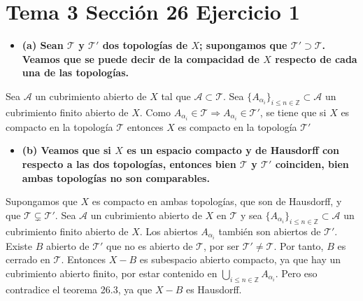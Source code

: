 \documentclass{article}
\begin{document}
\section{Tema 3 Sección 26 Ejercicio 1}
\begin{itemize}
\item \bf (a) \rm Sean $\mathcal{T}$ y $\mathcal{T}'$ dos topologías de $X$; supongamos que $\mathcal{T}'\supset \mathcal{T}$. Veamos que se puede decir de la compacidad de $X$ respecto de cada una de las topologías. 
\end{itemize}
Sea $\mathcal{A}$ un cubrimiento abierto de $X$ tal que $\mathcal{A}\subset\mathcal{T}$. Sea $\{A_{\alpha_i}\}_{i\leq n\in \mathbb{Z}}\subset \mathcal{A}$ un cubrimiento finito abierto de $X$. Como $A_{\alpha_i}\in \mathcal{T}\Rightarrow A_{\alpha_i}\in \mathcal{T}'$, se tiene que si $X$ es compacto en la topología $\mathcal{T}$ entonces $X$ es compacto en la topología $\mathcal{T}'$
\begin{itemize}
\item \bf (b) \rm Veamos que si $X$ es un espacio compacto y de Hausdorff con respecto a las dos topologías, entonces bien $\mathcal{T}$ y $\mathcal{T}'$ coinciden, bien ambas topologías no son comparables.
\end{itemize}
Supongamos que $X$ es compacto en ambas topologías, que son de Hausdorff, y que $\mathcal{T}\subsetneq\mathcal{T}'$. Sea $\mathcal{A}$ un cubrimiento abierto de $X$ en $\mathcal{T}$ y sea $\{A_{\alpha_i}\}_{i\leq n\in \mathbb{Z}}\subset \mathcal{A}$ un cubrimiento finito abierto de $X$. Los abiertos $A_{\alpha_i}$ también son abiertos de $\mathcal{T}'$. Existe $B$ abierto  de $\mathcal{T}'$ que no es abierto de $\mathcal{T}$, por ser $\mathcal{T}'\neq \mathcal{T}$. Por tanto, $B$ es cerrado en $\mathcal{T}$. Entonces $X-B$ es subespacio abierto compacto, ya que hay un cubrimiento abierto finito, por estar contenido en $\bigcup_{i\leq n\in \mathbb{Z}}A_{\alpha_i}$. Pero eso contradice el teorema 26.3, ya que $X-B$ es Hausdorff.
\end{document}
